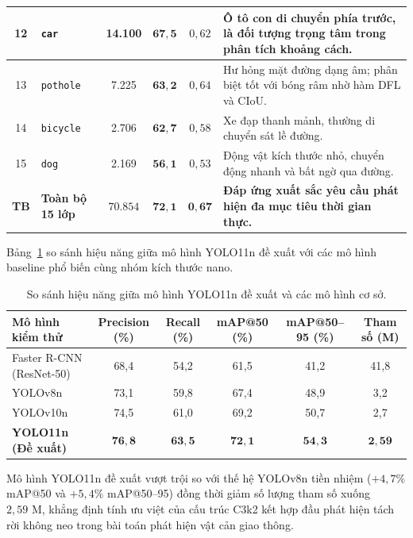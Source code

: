 \begin{table}[htbp]
\begin{tabular}{|c|l|c|c|c|p{4.2cm}|}
12 & \texttt{car} & 14.100 & $\mathbf{67,5}$ & $0,62$ & Ô tô con di chuyển phía trước, là đối tượng trọng tâm trong phân tích khoảng cách. \\ \hline
13 & \texttt{pothole} & 7.225 & $\mathbf{63,2}$ & $0,64$ & Hư hỏng mặt đường dạng âm; phân biệt tốt với bóng râm nhờ hàm DFL và CIoU. \\ \hline
14 & \texttt{bicycle} & 2.706 & $\mathbf{62,7}$ & $0,58$ & Xe đạp thanh mảnh, thường di chuyển sát lề đường. \\ \hline
15 & \texttt{dog} & 2.169 & $\mathbf{56,1}$ & $0,53$ & Động vật kích thước nhỏ, chuyển động nhanh và bất ngờ qua đường. \\ \hline
\textbf{TB} & \textbf{Toàn bộ 15 lớp} & $\mathbf{70.854}$ & $\mathbf{72,1}$ & $\mathbf{0,67}$ & \textbf{Đáp ứng xuất sắc yêu cầu phát hiện đa mục tiêu thời gian thực.} \\ \hline
\end{tabular}
\end{table}

Bảng~\ref{tab:model_comparison} so sánh hiệu năng giữa mô hình YOLO11n đề xuất với các mô hình baseline phổ biến cùng nhóm kích thước nano.

\begin{table}[htbp]
\centering
\caption{So sánh hiệu năng giữa mô hình YOLO11n đề xuất và các mô hình cơ sở.}
\label{tab:model_comparison}
\begin{tabular}{|l|c|c|c|c|c|}
\hline
\textbf{Mô hình kiểm thử} & \textbf{Precision (\%)} & \textbf{Recall (\%)} & \textbf{mAP@50 (\%)} & \textbf{mAP@50--95 (\%)} & \textbf{Tham số (M)} \\ \hline
Faster R-CNN (ResNet-50) & 68,4 & 54,2 & 61,5 & 41,2 & 41,8 \\ \hline
YOLOv8n & 73,1 & 59,8 & 67,4 & 48,9 & 3,2 \\ \hline
YOLOv10n & 74,5 & 61,0 & 69,2 & 50,7 & 2,7 \\ \hline
\textbf{YOLO11n (Đề xuất)} & $\mathbf{76,8}$ & $\mathbf{63,5}$ & $\mathbf{72,1}$ & $\mathbf{54,3}$ & $\mathbf{2,59}$ \\ \hline
\end{tabular}
\end{table}

Mô hình YOLO11n đề xuất vượt trội so với thế hệ YOLOv8n tiền nhiệm ($+4,7\%$ mAP@50 và $+5,4\%$ mAP@50--95) đồng thời giảm số lượng tham số xuống $2,59\text{ M}$, khẳng định tính ưu việt của cấu trúc C3k2 kết hợp đầu phát hiện tách rời không neo trong bài toán phát hiện vật cản giao thông.

